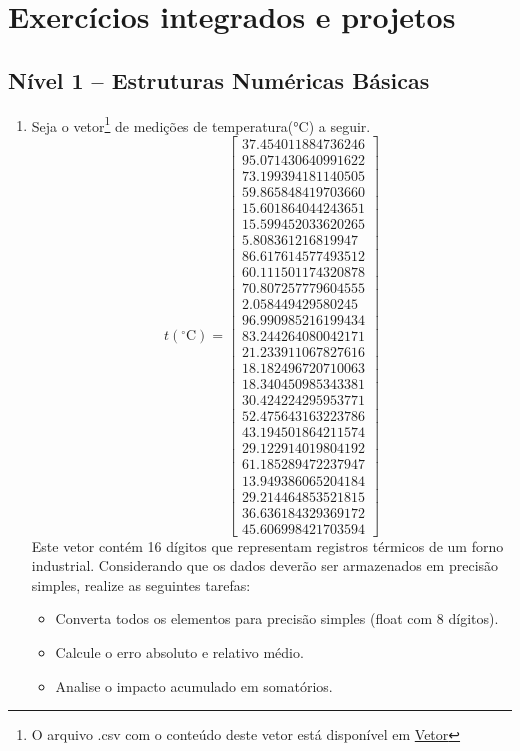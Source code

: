 \section{Exercícios integrados e projetos} \label{sec:ExercicioIntetradosProjetos}


\subsection*{Nível 1 -- Estruturas Numéricas Básicas}

\begin{enumerate}[label=\thesection.\arabic*]

\item Seja o vetor\footnote{O arquivo .csv com o conteúdo deste vetor está disponível 
em \href{https://github.com/JonathaCosta-IA/NM/blob/main/B-NM_codes/SolListaExerciciosPropostos/z_AplicMN_eng/dados.csv}{Vetor}} de medições de temperatura(°C) a seguir.
\[
t(^{\circ}\mathrm{C}) = \begin{bmatrix}
	37.454011884736246 \\
	95.071430640991622 \\
	73.199394181140505 \\
	59.865848419703660 \\
	15.601864044243651 \\
	15.599452033620265 \\
	5.808361216819947 \\
	86.617614577493512 \\
	60.111501174320878 \\
	70.807257779604555 \\
	2.058449429580245 \\
	96.990985216199434 \\
	83.244264080042171 \\
	21.233911067827616 \\
	18.182496720710063 \\
	18.340450985343381 \\
	30.424224295953771 \\
	52.475643163223786 \\
	43.194501864211574 \\
	29.122914019804192 \\
	61.185289472237947 \\
	13.949386065204184 \\
	29.214464853521815 \\
	36.636184329369172 \\
	45.606998421703594
\end{bmatrix}
\]
Este vetor contém 16 dígitos que representam registros térmicos de um forno industrial. 
Considerando que os dados deverão ser armazenados em precisão simples, realize as seguintes tarefas:
	\begin{itemize}
	\item Converta todos os elementos para precisão simples (float com 8 dígitos).
	\item Calcule o erro absoluto e relativo médio.
	\item Analise o impacto acumulado em somatórios.
	\end{itemize}
	

\end{enumerate}
